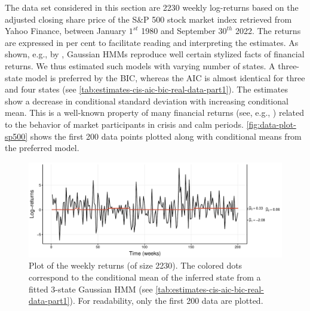 \documentclass[]{interact}\usepackage[]{graphicx}\usepackage[dvipsnames]{xcolor}
\makeatletter
\def\maxwidth{ %
  \ifdim\Gin@nat@width>\linewidth
    \linewidth
  \else
    \Gin@nat@width
  \fi
}
\newenvironment{knitrout}{}{} %
\theoremstyle{plain}%
\theoremstyle{definition}
\theoremstyle{remark}
\makeatother
\begin{document}
The data set considered in this section are 2230 weekly log-returns based on the adjusted closing share price of the S\&P 500 stock market index retrieved from Yahoo Finance, between January $1^{st}$ 1980 and September $30^{th}$ 2022.
The returns are expressed in per cent to facilitate reading and interpreting the estimates.
As shown, e.g., by \cite{rydenb}, Gaussian HMMs reproduce well certain stylized facts of financial returns. We thus estimated such models with varying number of states.
A three-state model is preferred by the BIC, whereas the AIC is almost identical for three and four states (see \autoref{tab:estimates-cis-aic-bic-real-data-part1}). The estimates show a decrease in conditional standard deviation with increasing conditional mean.
This is a well-known property of many financial returns (see, e.g., \cite{schwerta,maheua,guidolina}) related to the behavior of market participants in crisis and calm periods. \autoref{fig:data-plot-sp500} shows the first 200 data points plotted along with conditional means from the preferred model.



\begin{knitrout}
\color{fgcolor}\begin{figure}[htb]

{\centering \includegraphics[width=\maxwidth]{figure/data-plot-sp500-1} 

}

\caption{Plot of the weekly returns (of size 2230). The colored dots correspond to the conditional mean of the inferred state from a fitted 3-state Gaussian HMM (see \autoref{tab:estimates-cis-aic-bic-real-data-part1}). For readability, only the first 200 data are plotted.}\label{fig:data-plot-sp500}
\end{figure}

\end{knitrout}
\end{document}

